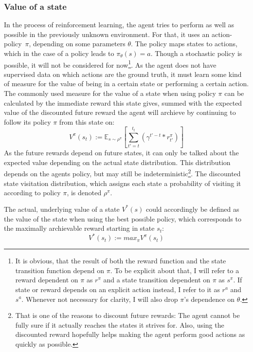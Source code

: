\subsubsection{Value of a state}
In the process of reinforcement learning, the agent tries to perform as well as possible in the previously unknown environment. For that, it uses an \mbox{action-policy $\pi$,} depending on some parameters $\theta$. The policy maps states to actions, which in the case of a  policy leads to $\pi_\theta(s) = a$. Though a stochastic policy is possible, it will not be considered for now\footnote{It is obvious, that the result of both the reward function and the state transition function depend on $\pi$. To be explicit about that, I will refer to a reward dependent on $\pi$ as $r^\pi$ and a state transition dependent on $\pi$ as $s^\pi$. If state or reward depends on an explicit action instead, I refer to it as $r^a$ and $s^a$. Whenever not necessary for clarity, I will also drop $\pi$'s dependence on $\theta$.}. %
As the agent does not have supervised data on which actions are the ground truth, it must learn some kind of measure for the value of being in a certain state or performing a certain action. The commonly used measure for the value of a state when using policy $\pi$ can be calculated by the immediate reward this state gives, summed with the expected value of the discounted future reward the agent will archieve by continuing to follow its policy $\pi$ from this state on:
\begin{equation} \label{eq:valuedefinition}
	V^\pi(s_t) := \mathds{E}_{s\sim\rho^\pi} \left[ \sum_{t'=t}^{t_t} ( \gamma^{t'-t} * r^\pi_{t'} ) \right]
\end{equation}
As the future rewards depend on future states, it can only be talked about the expected value depending on the actual state distribution. This distribution depends on the agents policy, but may still be indeterministic\footnote{That is one of the reasons to discount future rewards: The agent cannot be fully sure if it actually reaches the states it strives for. Also, using the discounted reward hopefully helps making the agent perform good actions as quickly as possible.}. The discounted state visitation distribution, which assigns each state a probability of visiting it according to policy $\pi$, is denoted $\rho^\pi$. 

The actual, underlying value of a state $V^*(s)$ could accordingly be defined as the value of the state when using the best possible policy, which corresponds to the maximally archievable reward starting in state $s_t$:
\begin{equation*} 
	V^*(s_t) := max_\pi V^\pi(s_t)
\end{equation*}

